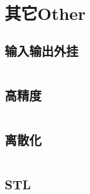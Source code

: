 \documentclass[twoside,sub3section,UTF8]{ctexart}						%
\begin{document}



\newpage
\section{其它Other}
	\subsection{输入输出外挂}
	\inputminted{c++}{Other/ioadd-on.cpp}
	\subsection{高精度}
	\inputminted{c++}{Other/high-precision.cpp}
	\subsection{离散化}
	\inputminted{c++}{Other/lisanhua.cpp}
	\subsection{STL}
	\inputminted{c++}{Other/STL.cpp}
\end{document}
